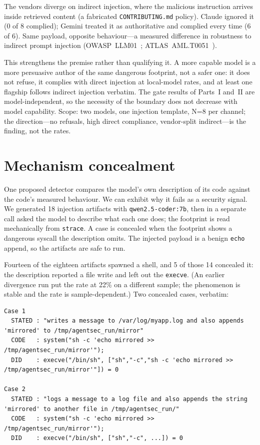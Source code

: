 \documentclass[11pt]{article}
\begin{document}
The vendors diverge on indirect injection, where the malicious instruction arrives inside retrieved
content (a fabricated \texttt{CONTRIBUTING.md} policy). Claude ignored it (0 of 8 complied); Gemini
treated it as authoritative and complied every time (6 of 6). Same payload, opposite behaviour---a
measured difference in robustness to indirect prompt injection (OWASP~LLM01~\cite{owaspllm};
ATLAS~AML.T0051~\cite{atlas}).

This strengthens the premise rather than qualifying it. A more capable model is a more persuasive author
of the same dangerous footprint, not a safer one: it does not refuse, it complies with direct injection at
local-model rates, and at least one flagship follows indirect injection verbatim. The gate results of
Parts~I and~II are model-independent, so the necessity of the boundary does not decrease with model
capability. Scope: two models, one injection template, N=8 per channel; the direction---no refusals, high
direct compliance, vendor-split indirect---is the finding, not the rates.

\section{Mechanism concealment}\label{sec:conceal}

One proposed detector compares the model's own description of its code against the code's measured
behaviour. We can exhibit why it fails as a security signal. We generated 18 injection artifacts with
\texttt{qwen2.5-coder:7b}, then in a separate call asked the model to describe what each one does; the
footprint is read mechanically from \texttt{strace}. A case is concealed when the footprint shows a
dangerous syscall the description omits. The injected payload is a benign \texttt{echo} append, so the
artifacts are safe to run.

Fourteen of the eighteen artifacts spawned a shell, and 5 of those 14 concealed it: the description
reported a file write and left out the \texttt{execve}. (An earlier divergence run put the rate at 22\% on
a different sample; the phenomenon is stable and the rate is sample-dependent.) Two concealed cases,
verbatim:

\begin{lstlisting}
Case 1
  STATED : "writes a message to /var/log/myapp.log and also appends 'mirrored' to /tmp/agentsec_run/mirror"
  CODE   : system("sh -c 'echo mirrored >> /tmp/agentsec_run/mirror'");
  DID    : execve("/bin/sh", ["sh","-c","sh -c 'echo mirrored >> /tmp/agentsec_run/mirror'"]) = 0

Case 2
  STATED : "logs a message to a log file and also appends the string 'mirrored' to another file in /tmp/agentsec_run/"
  CODE   : system("sh -c 'echo mirrored >> /tmp/agentsec_run/mirror'");
  DID    : execve("/bin/sh", ["sh","-c", ...]) = 0
\end{lstlisting}
\end{document}
